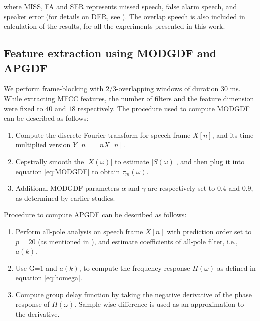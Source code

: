 \documentclass[conference]{IEEEtran}
\begin{document}
where MISS, FA and SER represents  missed speech, false alarm speech, and speaker error (for details on DER, see \cite{NIST}). The overlap speech is also included in calculation of the results, for all the experiments presented in this work. 

\subsection{Feature extraction using MODGDF and APGDF}

We perform frame-blocking with $2/3$-overlapping windows of duration 30 ms. 
While extracting MFCC features, the
number of filters and the feature dimension were fixed to $40$ and $18$
respectively. The procedure used to compute MODGDF can be described as follows:

\begin{enumerate}
\item Compute the discrete Fourier transform for speech frame $X[n]$, and its time
multiplied version $Y[n]=nX[n]$.
\item Cepstrally smooth the $|X(\omega)|$ to estimate $|S(\omega)|$,
and then plug it into equation \ref{eq:MODGDF} to obtain $\tau_{m}(\omega)$.
\item Additional MODGDF parameters $\alpha$ and $\gamma$ are respectively set to $0.4$ and $0.9$,
as determined by earlier studies. \cite{modifiedGD}
\end{enumerate}	

\vspace{0.2cm}
Procedure to compute APGDF can be described as follows:
\begin{enumerate}
\item Perform all-pole analysis on speech frame $X[n]$ with prediction order set to
$p=20$ (as mentioned in \cite{allPoleGdSid}), and estimate coefficients of all-pole filter, i.e., $a(k)$.   
\item Use G=1 and $a(k)$, to compute the frequency response $H(\omega)$ as defined
in equation \ref{eq:homega}.
\item Compute group delay function by taking the negative derivative of
the phase response of $H(\omega)$. Sample-wise
difference is used as an approximation to the derivative.
\end{enumerate}	
\vspace{0.2cm}
\end{document}
